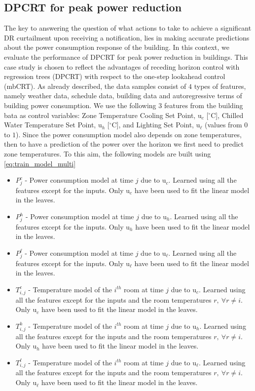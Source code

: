 \subsection{DPCRT for peak power reduction}

\textcolor[rgb]{0.00,0.00,1.00}{The key to answering the question of what actions to take to achieve a significant DR curtailment upon receiving a notification, lies in making accurate predictions about the power consumption response of the building. In this context, we evaluate the performance of DPCRT for peak power reduction in buildings. This case study is chosen to reflect the advantages of receding horizon control with regression trees (DPCRT) with respect to the one-step lookahead control (mbCRT). As already described, the data samples consist of $4$ types of features, namely weather data, schedule data, building data and autoregressive terms of building power consumption. We use the following $3$ features from the building bata as control variables: Zone Temperature Cooling Set Point, $\mathrm{u}_c$ [$^{\circ}$C], Chilled Water Temperature Set Point, $\mathrm{u}_h$ [$^{\circ}$C], and Lighting Set Point, $\mathrm{u}_\ell$ (values from $0$ to $1$). Since the power consumption model also depends on zone temperatures, then to have a prediction of the power over the horizon we first need to predict zone temperatures. To this aim, the following models are built using \eqref{eq:train_model_multi}
\begin{itemize}[leftmargin=1cm]
	\item $P_j^c$ - Power consumption model at time $j$ due to $\mathrm{u}_c$. Learned using all the features except for the inputs. Only $\mathrm{u}_c$ have been used to fit the linear model in the leaves.
	\item $P_j^h$ - Power consumption model at time $j$ due to $\mathrm{u}_h$. Learned using all the features except for the inputs. Only $\mathrm{u}_h$ have been used to fit the linear model in the leaves.
	\item $P_j^\ell$ - Power consumption model at time $j$ due to $\mathrm{u}_\ell$. Learned using all the features except for the inputs. Only $\mathrm{u}_\ell$ have been used to fit the linear model in the leaves.
	\item $T_{i,j}^c$ - Temperature model of the $i^{th}$ room at time $j$ due to $\mathrm{u}_c$. Learned using all the features except for the inputs and the room temperatures $r,\ \forall r\neq i$. Only $\mathrm{u}_c$ have been used to fit the linear model in the leaves.
	\item $T_{i,j}^h$ - Temperature model of the $i^{th}$ room at time $j$ due to $\mathrm{u}_h$. Learned using all the features except for the inputs and the room temperatures $r,\ \forall r\neq i$. Only $\mathrm{u}_h$ have been used to fit the linear model in the leaves.
	\item $T_{i,j}^\ell$ - Temperature model of the $i^{th}$ room at time $j$ due to $\mathrm{u}_\ell$. Learned using all the features except for the inputs and the room temperatures $r,\ \forall r\neq i$. Only $\mathrm{u}_\ell$ have been used to fit the linear model in the leaves.
\end{itemize}
}

